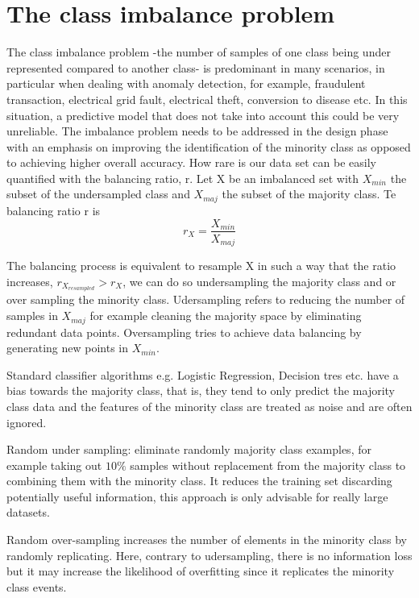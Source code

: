 \documentclass[11pt]{article}
\begin{document}
\section{The class imbalance problem}
The class imbalance problem -the number of samples of one class being under represented compared to another class- is predominant in many scenarios, in particular when dealing with anomaly detection, for example, fraudulent transaction, electrical grid fault, electrical theft, conversion to disease  etc. In this situation, a predictive model that does not take into account this could be very unreliable.
The imbalance problem needs to be addressed in the design phase with an emphasis on improving the identification of the minority class as opposed to achieving higher overall accuracy.
How rare is our data set can be easily quantified with the balancing ratio, r. Let X be an imbalanced set with $X_{min}$ the subset of the undersampled class and $X_{maj}$ the subset of the majority class. Te balancing ratio r is
\begin{equation}
r_X = \frac{X_{min}}{X_{maj}}
\end{equation}

The balancing process is equivalent to resample X in such a way that the ratio increases, $r_{X_{resampled}} > r_X$, we can do so undersampling the majority class and or over sampling the minority class. Udersampling refers to reducing the number of samples in $X_{maj}$ for example cleaning the majority space by eliminating redundant data points. Oversampling tries to achieve data balancing by generating new points in $X_{min}$.

Standard classifier algorithms e.g. Logistic Regression, Decision tres etc. have a bias towards the majority class, that is, they tend to only predict the majority class data and the features of the minority class are treated as noise and are often ignored. 


Random under sampling: eliminate randomly majority class examples, for example taking out $10\%$ samples without replacement from the majority class to combining them with the minority class. It reduces the training set discarding potentially useful information, this approach is only advisable for really large datasets.

Random over-sampling increases the number of elements in the minority class by randomly replicating. Here, contrary to udersampling, there is no information loss but it may increase the likelihood of overfitting since it replicates the minority class events.
\end{document}
